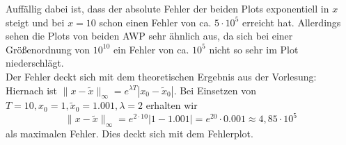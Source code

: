 \documentclass[11pt,a4paper,ngerman]{article}
\begin{document}
\begin{description}
\begin{figure}[ht!]
\center
{}
\end{figure}

\end{description}

Auffällig dabei ist, dass der absolute Fehler der beiden Plots exponentiell in $x$ steigt und bei $x = 10$ schon einen Fehler von ca. $5 \cdot 10^5$ erreicht hat. Allerdings sehen die Plots von beiden AWP sehr ähnlich aus, da sich bei einer Größenordnung von $10^10$ ein Fehler von ca. $10^5$ nicht so sehr im Plot niederschlägt. \\
Der Fehler deckt sich mit dem theoretischen Ergebnis aus der Vorlesung:\\
Hiernach ist $\| x - \tilde{x} \|_{\infty} = e^{\lambda T} |x_0 - \tilde{x}_0|$.
Bei Einsetzen von $T = 10, x_0 = 1, \tilde{x}_0 = 1.001, \lambda = 2$ erhalten wir
$$
\| x - \tilde{x} \|_{\infty} = e^{2\cdot 10} |1 - 1.001| = e^20 \cdot 0.001 \approx 4,85 \cdot 10^5
$$
als maximalen Fehler. Dies deckt sich mit dem Fehlerplot.




\label{LastPage}
\end{document}
